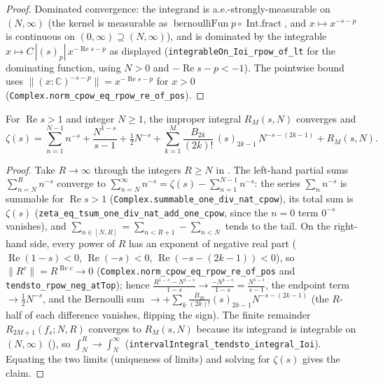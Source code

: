 \begin{proof}
\leanok
{}
Dominated convergence: the integrand is a.e.-strongly-measurable on $(N,\infty)$ (the kernel
is measurable as $\operatorname{bernoulliFun} p \circ \operatorname{Int.fract}$, and
$x \mapsto x^{-s-p}$ is continuous on $(0,\infty) \supseteq (N,\infty)$), and is dominated by
the integrable $x \mapsto C\,|(s)_p|\,x^{-\operatorname{Re} s - p}$ as displayed
(\texttt{integrableOn\_Ioi\_rpow\_of\_lt} for the dominating function, using $N > 0$ and
$-\operatorname{Re} s - p < -1$). The pointwise bound uses
$\|(x:\mathbb{C})^{-s-p}\| = x^{-\operatorname{Re} s - p}$ for $x > 0$
(\texttt{Complex.norm\_cpow\_eq\_rpow\_re\_of\_pos}).
\end{proof}

\begin{lemma}
\label{lem:zeta_em_conv}
\leanok
{}
For $\operatorname{Re} s > 1$ and integer $N \ge 1$, the improper integral $R_M(s,N)$
converges and
\[
  \zeta(s) = \sum_{n=1}^{N-1} n^{-s} + \frac{N^{1-s}}{s-1} + \tfrac12 N^{-s}
    + \sum_{k=1}^{M} \frac{B_{2k}}{(2k)!}\,(s)_{2k-1}\,N^{-s-(2k-1)} + R_M(s,N).
\]
\end{lemma}

\begin{proof}
\leanok
{}
Take $R \to \infty$ through the integers $R \ge N$ in . The left-hand
partial sums $\sum_{n=N}^{R} n^{-s}$ converge to $\sum_{n=N}^{\infty} n^{-s} =
\zeta(s) - \sum_{n=1}^{N-1} n^{-s}$: the series $\sum_n n^{-s}$ is summable for
$\operatorname{Re} s > 1$ (\texttt{Complex.summable\_one\_div\_nat\_cpow}), its total sum is
$\zeta(s)$ (\texttt{zeta\_eq\_tsum\_one\_div\_nat\_add\_one\_cpow}, since the $n=0$ term
$0^{-s}$ vanishes), and $\sum_{n \in [N,R]} = \sum_{n<R+1} - \sum_{n<N}$ tends to the tail.
On the right-hand side, every power of $R$ has an exponent of negative real part
($\operatorname{Re}(1-s) < 0$, $\operatorname{Re}(-s) < 0$,
$\operatorname{Re}(-s-(2k-1)) < 0$), so $\|R^{c}\| = R^{\operatorname{Re} c} \to 0$
(\texttt{Complex.norm\_cpow\_eq\_rpow\_re\_of\_pos} and \texttt{tendsto\_rpow\_neg\_atTop});
hence $\frac{R^{1-s}-N^{1-s}}{1-s} \to \frac{-N^{1-s}}{1-s} = \frac{N^{1-s}}{s-1}$, the
endpoint term $\to \tfrac12 N^{-s}$, and the Bernoulli sum $\to +\sum_k \frac{B_{2k}}{(2k)!}
(s)_{2k-1} N^{-s-(2k-1)}$ (the $R$-half of each difference vanishes, flipping the sign). The
finite remainder $R_{2M+1}(f_s; N, R)$ converges to $R_M(s,N)$ because its integrand is
integrable on $(N,\infty)$ (), so
$\int_N^R \to \int_N^{\infty}$ (\texttt{intervalIntegral\_tendsto\_integral\_Ioi}). Equating
the two limits (uniqueness of limits) and solving for $\zeta(s)$ gives the claim.
\end{proof}

